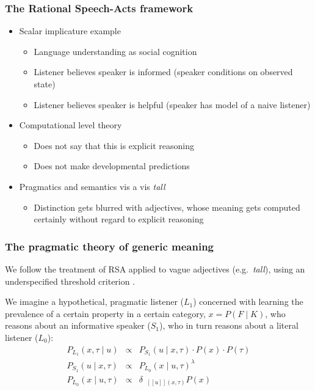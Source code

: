 \documentclass[12pt,letterpaper]{article}
\newcommand{\denote}[1]{\mbox{ $[\![ #1 ]\!]$}}
\begin{document}
\subsubsection*{The Rational Speech-Acts framework}

\begin{itemize}
\item Scalar implicature example
	\begin{itemize}
		\item Language understanding as social cognition
		\item Listener believes speaker is informed (speaker conditions on observed state)
		\item Listener believes speaker is helpful (speaker has model of a naive listener)
	\end{itemize}
\item Computational level theory
	\begin{itemize}
		\item Does not say that this is explicit reasoning
		\item Does not make developmental predictions
	\end{itemize}
\item Pragmatics and semantics vis a vis \emph{tall}
	\begin{itemize}
		\item Distinction gets blurred with adjectives, whose meaning gets computed certainly without regard to explicit reasoning
	\end{itemize}
\end{itemize}


\subsubsection*{The pragmatic theory of generic meaning}


We follow the treatment of RSA applied to vague adjectives (e.g.~\emph{tall}), using an underspecified threshold criterion \cite{Lassiter2013,Lassiter2015}.

We imagine a hypothetical, pragmatic listener ($L_1$) concerned with learning the prevalence of a certain property in a certain category, $x=P(F \mid K)$, who reasons about an informative speaker ($S_1$), who in turn reasons about a literal listener ($L_0$):
\begin{eqnarray}
P_{L_{1}}(x , \tau \mid u) &\propto& P_{S_{1}}(u \mid x, \tau) \cdot P(x) \cdot P(\tau) \label{eq:L1}\\
P_{S_{1}}(u \mid x, \tau) &\propto&  {P_{L_{0}}(x \mid u, \tau)}^{\lambda} \label{eq:S1}\\
P_{L_{0}}(x \mid u, \tau) &\propto& {\delta_{\denote{u}(x, \tau)} P(x)} \label{eq:L0}
\end{eqnarray}
\end{document}

